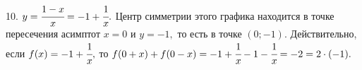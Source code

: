 10. $y=\cfrac{1-x}{x}=-1+\cfrac{1}{x}.$ Центр симметрии этого графика находится в точке пересечения асимптот $x=0$ и $y=-1,$ то есть в точке $(0;-1).$ Действительно, если $f(x)=-1+\cfrac{1}{x},$ то $f(0+x)+f(0-x)=-1+\cfrac{1}{x}-1-\cfrac{1}{x}=-2=2\cdot(-1).$\\
